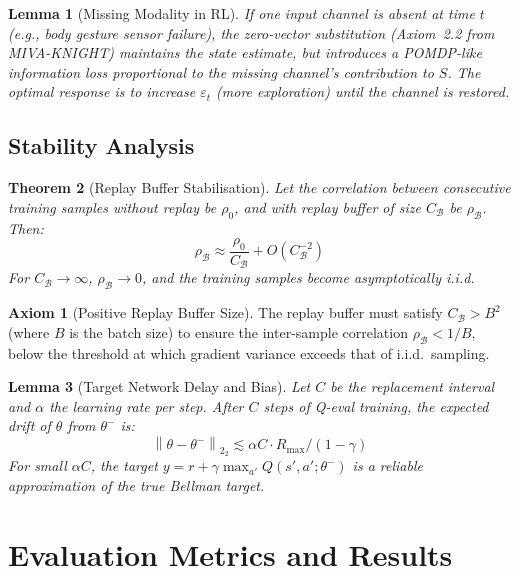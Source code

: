 \documentclass[12pt,a4paper]{article}
\theoremstyle{definition}
\newtheorem{axiom}{Axiom}[section]
\theoremstyle{plain}
\newtheorem{theorem}{Theorem}[section]
\newtheorem{lemma}[theorem]{Lemma}
\theoremstyle{remark}
\newcommand{\Norm}[1]{\left\|#1\right\|_2}
\begin{document}
\begin{lemma}[Missing Modality in RL]
If one input channel is absent at time $t$ (e.g., body gesture sensor failure), the zero-vector substitution (Axiom~2.2 from MIVA-KNIGHT) maintains the state estimate, but introduces a POMDP-like information loss proportional to the missing channel's contribution to $S$. The optimal response is to increase $\varepsilon_t$ (more exploration) until the channel is restored.
\end{lemma}

\subsection{Stability Analysis}

\begin{theorem}[Replay Buffer Stabilisation]
Let the correlation between consecutive training samples without replay be $\rho_0$, and with replay buffer of size $C_\mathcal{B}$ be $\rho_\mathcal{B}$. Then:
\[
  \rho_\mathcal{B} \approx \frac{\rho_0}{C_\mathcal{B}} + O(C_\mathcal{B}^{-2})
\]
For $C_\mathcal{B} \to \infty$, $\rho_\mathcal{B} \to 0$, and the training samples become asymptotically i.i.d.
\end{theorem}

\begin{axiom}[Positive Replay Buffer Size]
The replay buffer must satisfy $C_\mathcal{B} > B^2$ (where $B$ is the batch size) to ensure the inter-sample correlation $\rho_\mathcal{B} < 1/B$, below the threshold at which gradient variance exceeds that of i.i.d.\ sampling.
\end{axiom}

\begin{lemma}[Target Network Delay and Bias]
Let $C$ be the replacement interval and $\alpha$ the learning rate per step. After $C$ steps of Q-eval training, the expected drift of $\theta$ from $\theta^-$ is:
\[
  \Norm{\theta - \theta^-}_2 \lesssim \alpha C \cdot R_{\max} / (1 - \gamma)
\]
For small $\alpha C$, the target $y = r + \gamma \max_{a'} Q(s', a'; \theta^-)$ is a reliable approximation of the true Bellman target.
\end{lemma}

\newpage
\section{Evaluation Metrics and Results}
\label{sec:eval_rl}
\end{document}

